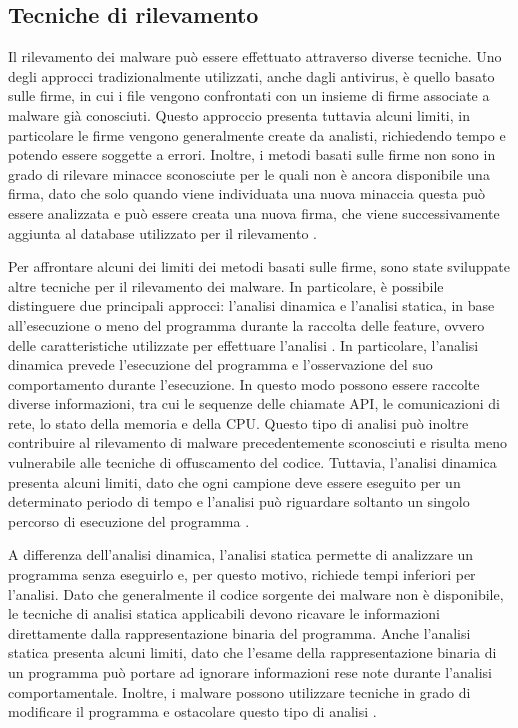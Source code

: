 \subsection{Tecniche di rilevamento}

Il rilevamento dei malware può essere effettuato attraverso diverse
tecniche. Uno degli approcci tradizionalmente utilizzati, anche dagli
antivirus, è quello basato sulle firme, in cui i file vengono confrontati
con un insieme di firme associate a malware già conosciuti.
Questo approccio presenta tuttavia alcuni limiti, in particolare le firme
vengono generalmente create da analisti, richiedendo tempo e potendo
essere soggette a errori. Inoltre, i metodi basati sulle firme non sono
in grado di rilevare minacce sconosciute per le quali non è ancora
disponibile una firma, dato che solo quando viene individuata una nuova
minaccia questa può essere analizzata e può essere creata una nuova
firma, che viene successivamente aggiunta al database utilizzato per
il rilevamento \cite{egele2012}.

Per affrontare alcuni dei limiti dei metodi basati sulle firme, sono
state sviluppate altre tecniche per il rilevamento dei malware. In
particolare, è possibile distinguere due principali approcci:
l'analisi dinamica e l'analisi statica, in base all'esecuzione o meno
del programma durante la raccolta delle feature, ovvero delle
caratteristiche utilizzate per effettuare l'analisi
\cite{zhang2024}.
In particolare, l'analisi dinamica prevede
l'esecuzione del programma e l'osservazione del suo comportamento
durante l'esecuzione. In questo modo possono
essere raccolte diverse informazioni, tra cui le sequenze delle
chiamate API, le comunicazioni di rete, lo stato della memoria e
della CPU. Questo tipo di analisi può inoltre contribuire al
rilevamento di malware precedentemente sconosciuti e risulta meno
vulnerabile alle tecniche di offuscamento del codice. 
Tuttavia, l'analisi dinamica presenta alcuni limiti,
dato che ogni campione deve essere eseguito per un determinato periodo
di tempo e l'analisi può riguardare soltanto un singolo percorso di
esecuzione del programma \cite{bai2014}.

A differenza dell'analisi dinamica, l'analisi statica permette di
analizzare un programma senza eseguirlo e, per questo motivo, richiede
tempi inferiori per l'analisi. Dato che generalmente il codice sorgente
dei malware non è disponibile, le tecniche di analisi statica
applicabili devono ricavare le informazioni direttamente dalla
rappresentazione binaria del programma.
Anche l'analisi statica presenta alcuni limiti, dato che
l'esame della rappresentazione binaria di un programma
può portare ad ignorare informazioni rese note durante
l'analisi comportamentale.
Inoltre, i malware possono utilizzare tecniche
in grado di modificare il programma e ostacolare questo tipo di
analisi \cite{egele2012}.

